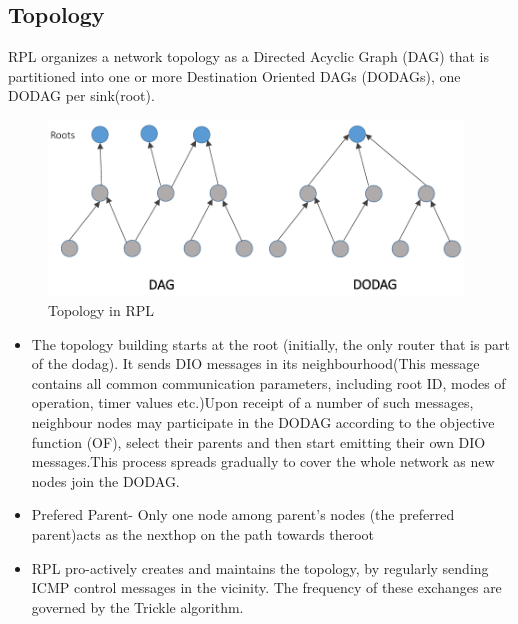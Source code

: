 \subsection{Topology} \label{Topology}
RPL organizes a network topology as a Directed Acyclic Graph (DAG) that is partitioned into one or more Destination Oriented DAGs (DODAGs), one DODAG per sink(root).\\
\begin{figure}[h!]
\centering
\includegraphics[width=110mm]{dag.png}
\caption{Topology in RPL}
\end{figure}
\begin{itemize}
\item The topology building starts at the root (initially, the only router that is part of the dodag). It sends DIO messages in its neighbourhood(This message contains all common communication parameters, including root ID, modes of operation, timer values etc.)Upon receipt of a number of such messages, neighbour nodes may participate in the DODAG according to the objective function (OF), select their parents and then start emitting their own DIO messages.This process spreads gradually to cover the whole network as new nodes join the DODAG.
\item Prefered Parent- Only one node among parent’s nodes (the preferred parent)acts as the nexthop on the path towards theroot
\item RPL pro-actively creates and maintains the topology, by regularly sending ICMP control messages in the vicinity. The frequency of these exchanges are governed by the Trickle algorithm.
\end{itemize}
